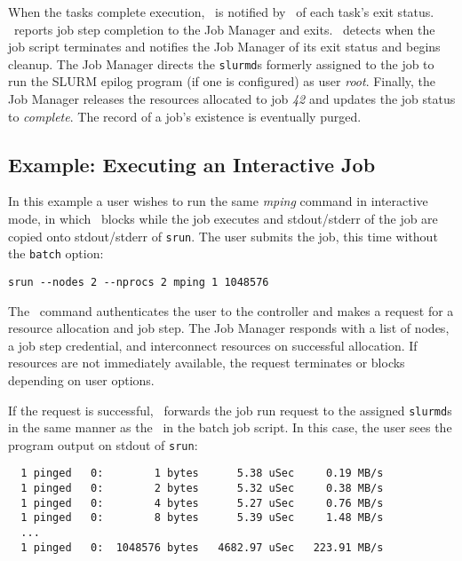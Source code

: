 \documentclass[10pt,onecolumn,times]{../common/llncs}
\begin{document}
{When the tasks complete execution, \srun\ is notified by \slurmd\ of
each task's exit status. \srun\ reports job step completion to the Job
Manager and exits.  \slurmd\ detects when the job script terminates and
notifies the Job Manager of its exit status and begins cleanup.  The Job
Manager directs the {\tt slurmd}s formerly assigned to the job to run
the SLURM epilog program (if one is configured) as user {\em root}.
Finally, the Job Manager releases the resources allocated to job {\em 42} 
and updates the job status to {\em complete}. The record of a job's
existence is eventually purged.

\subsection{Example:  Executing an Interactive Job}

In this example a user wishes to run the same {\em mping} command 
in interactive mode, in which \srun\ blocks while the job executes 
and stdout/stderr of the job are copied onto stdout/stderr of {\tt srun}.
The user submits the job, this time without the {\tt batch} option:

\begin{verbatim}
srun --nodes 2 --nprocs 2 mping 1 1048576
\end{verbatim}

The \srun\ command authenticates the user to the controller and makes a
request for a resource allocation and job step. The Job Manager
responds with a list of nodes, a job step credential, and interconnect
resources on successful allocation. If resources are not immediately
available, the request terminates or blocks depending on user options.

If the request is successful, \srun\ forwards the job run request to
the assigned {\tt slurmd}s in the same manner as the \srun\ in the batch
job script. In this case, the user sees the program output on stdout of
{\tt srun}:

\begin{verbatim}
  1 pinged   0:        1 bytes      5.38 uSec     0.19 MB/s                     
  1 pinged   0:        2 bytes      5.32 uSec     0.38 MB/s                     
  1 pinged   0:        4 bytes      5.27 uSec     0.76 MB/s                     
  1 pinged   0:        8 bytes      5.39 uSec     1.48 MB/s                     
  ...
  1 pinged   0:  1048576 bytes   4682.97 uSec   223.91 MB/s              
\end{verbatim}

}
\end{document}
